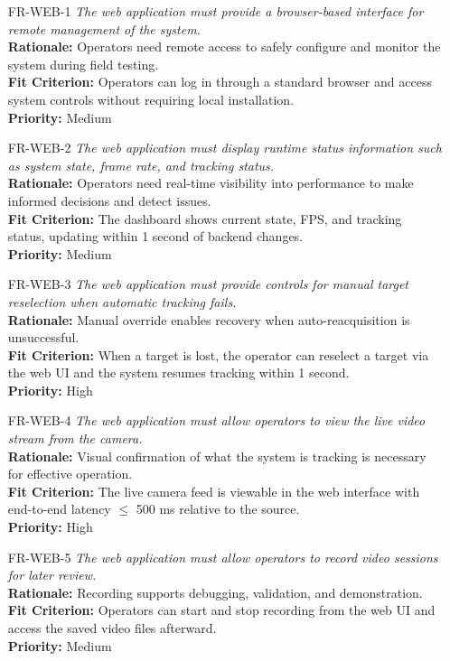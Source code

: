 \documentclass[12pt]{article}
\begin{document}
\begin{itemize}
\item[FR-WEB-1] \emph{The web application must provide a browser-based interface for remote management of the system.}\\[2mm]
  {\bf Rationale:} Operators need remote access to safely configure and monitor the system during field testing.\\
  {\bf Fit Criterion:} Operators can log in through a standard browser and access system controls without requiring local installation.\\
  {\bf Priority:} Medium

\item[FR-WEB-2] \emph{The web application must display runtime status information such as system state, frame rate, and tracking status.}\\[2mm]
  {\bf Rationale:} Operators need real-time visibility into performance to make informed decisions and detect issues.\\
  {\bf Fit Criterion:} The dashboard shows current state, FPS, and tracking status, updating within 1 second of backend changes.\\
  {\bf Priority:} Medium

\item[FR-WEB-3] \emph{The web application must provide controls for manual target reselection when automatic tracking fails.}\\[2mm]
  {\bf Rationale:} Manual override enables recovery when auto-reacquisition is unsuccessful.\\
  {\bf Fit Criterion:} When a target is lost, the operator can reselect a target via the web UI and the system resumes tracking within 1 second.\\
  {\bf Priority:} High

\item[FR-WEB-4] \emph{The web application must allow operators to view the live video stream from the camera.}\\[2mm]
  {\bf Rationale:} Visual confirmation of what the system is tracking is necessary for effective operation.\\
  {\bf Fit Criterion:} The live camera feed is viewable in the web interface with end-to-end latency $\leq$ 500 ms relative to the source.\\
  {\bf Priority:} High

\item[FR-WEB-5] \emph{The web application must allow operators to record video sessions for later review.}\\[2mm]
  {\bf Rationale:} Recording supports debugging, validation, and demonstration.\\
  {\bf Fit Criterion:} Operators can start and stop recording from the web UI and access the saved video files afterward.\\
  {\bf Priority:} Medium


\end{itemize}
\end{document}
